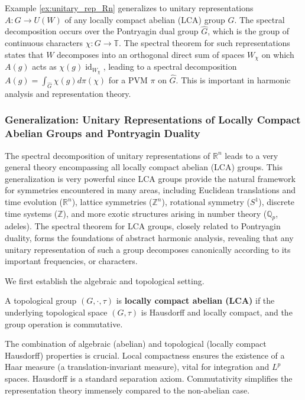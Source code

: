 \begin{remark}
\label{rem:abelian_groups_pontryagin}
Example \ref{ex:unitary_rep_Rn} generalizes to unitary representations $A: G \to U(W)$ of any locally compact abelian (LCA) group $G$. The spectral decomposition occurs over the Pontryagin dual group $\hat{G}$, which is the group of continuous characters $\chi: G \to \mathbb{T}$. The spectral theorem for such representations states that $W$ decomposes into an orthogonal direct sum of spaces $W_\chi$ on which $A(g)$ acts as $\chi(g)\operatorname{id}_{W_\chi}$, leading to a spectral decomposition $A(g) = \int_{\hat{G}} \chi(g) d\pi(\chi)$ for a PVM $\pi$ on $\hat{G}$. This is important in harmonic analysis and representation theory.
\end{remark}


\subsubsection{Generalization: Unitary Representations of Locally Compact Abelian Groups and Pontryagin Duality}
\label{subsec:lca_reps_fully_expanded}

The spectral decomposition of unitary representations of $\mathbb{R}^n$ leads to a very general theory encompassing all locally compact abelian (LCA) groups. This generalization is very powerful since LCA groups provide the natural framework for symmetries encountered in many areas, including Euclidean translations and time evolution ($\mathbb{R}^n$), lattice symmetries ($\mathbb{Z}^n$), rotational symmetry ($S^1$), discrete time systems ($\mathbb{Z}$), and more exotic structures arising in number theory ($\mathbb{Q}_p$, adeles). The spectral theorem for LCA groups, closely related to Pontryagin duality, forms the foundations of abstract harmonic analysis, revealing that any unitary representation of such a group decomposes canonically according to its important frequencies, or characters.

We first establish the algebraic and topological setting.

\begin{definition}
A topological group $(G, \cdot, \tau)$ is \textbf{locally compact abelian (LCA)} if the underlying topological space $(G, \tau)$ is Hausdorff and locally compact, and the group operation is commutative.
\end{definition}

The combination of algebraic (abelian) and topological (locally compact Hausdorff) properties is crucial. Local compactness ensures the existence of a Haar measure (a translation-invariant measure), vital for integration and $L^p$ spaces. Hausdorff is a standard separation axiom. Commutativity simplifies the representation theory immensely compared to the non-abelian case.

